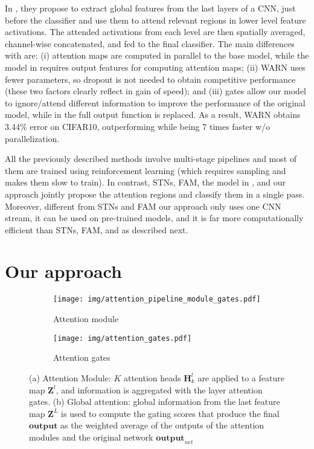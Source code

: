 \documentclass[runningheads]{llncs}
\begin{document}
In \cite{jetley2018learn}, they propose to extract global features from the last layers of a CNN, just before the classifier and use them to attend relevant regions in lower level feature activations. The attended activations from each level are then spatially averaged, channel-wise concatenated, and fed to the final classifier. The main differences with \cite{jetley2018learn} are: (i) attention maps are computed in parallel to the base model, while the model in \cite{jetley2018learn} requires output features for computing attention maps; (ii) WARN uses fewer parameters, so dropout is not needed to obtain competitive performance (these two factors clearly reflect in gain of speed); and (iii) gates allow our model to ignore/attend different information to improve the performance of the original model, while in \cite{jetley2018learn} the full output function is replaced. As a result, WARN obtains 3.44\% error on CIFAR10, outperforming \cite{jetley2018learn} while being 7 times faster w/o parallelization. 

All the previously described methods involve multi-stage pipelines and most of them are trained using reinforcement learning (which requires sampling and makes them slow to train). In contrast, STNs, FAM, the model in \cite{jetley2018learn}, and our approach jointly propose the attention regions and classify them in a single pass. Moreover, different from STNs and FAM our approach only uses one CNN stream, it can be used on pre-trained models, and it is far more computationally efficient than STNs, FAM, and \cite{jetley2018learn} as described next.

\section{Our approach}
\label{sect:approach}

\begin{figure}[t!]
\centering 
\begin{subfigure}{0.55\textwidth}
	\texttt{[image: img/attention\_pipeline\_module\_gates.pdf]}
\caption{Attention module}
\label{fig:attention_module}
\end{subfigure}
\begin{subfigure}{0.4\textwidth}
	\texttt{[image: img/attention\_gates.pdf]}
\caption{Attention gates}
\label{fig:attention_gates}
\end{subfigure}
\caption{(a) Attention Module: $K$ attention heads $\mathbf{H}^l_k$ are applied to a feature map $\mathbf{Z}^l$, and information is aggregated with the layer attention gates. (b) Global attention: global information from the last feature map $\mathbf{Z}^L$ is used to compute the gating scores that produce the final $\mathbf{output}$ as the weighted average of the outputs of the attention modules and the original network $\mathbf{output}_{net}$}
\label{fig:modules}
\end{figure}
\end{document}
